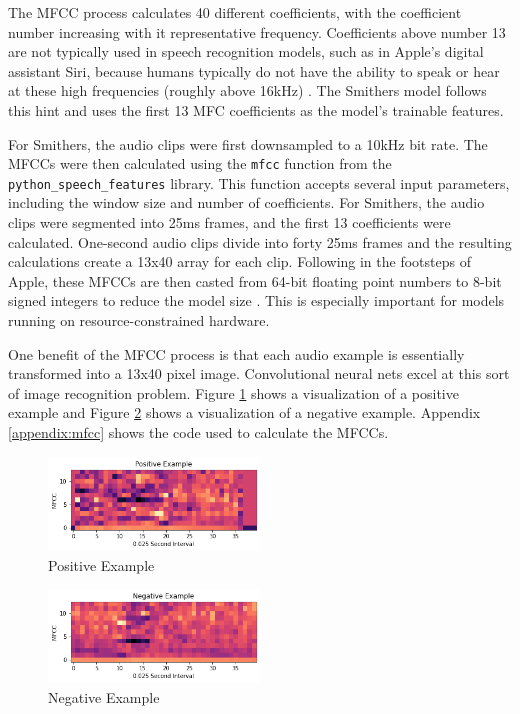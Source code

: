 \documentclass[conference]{IEEEtran}
\newcommand{\code}[1]{\texttt{#1}}
\begin{document}
The MFCC process calculates 40 different coefficients,
with the coefficient number increasing with it representative frequency.
Coefficients above number 13 are not typically used in speech recognition models,
such as in Apple's digital assistant Siri,
because humans typically do not have the ability 
to speak or hear at these high frequencies (roughly above 16kHz) \cite{Efficient}.
The Smithers model follows this hint and uses the first 13 MFC coefficients as the model's trainable features.

For Smithers, the audio clips were first downsampled to a 10kHz bit rate.
The MFCCs were then calculated using the \code{mfcc} function 
from the \code{python\_speech\_features} library.
This function accepts several input parameters, including the window size and number of coefficients.
For Smithers, the audio clips were segmented into 25ms frames, and the first 13 coefficients were calculated.
One-second audio clips divide into forty 25ms frames and the resulting calculations create a 13x40 array for each clip.
Following in the footsteps of Apple,
these MFCCs are then casted from 64-bit floating point numbers 
to 8-bit signed integers to reduce the model size \cite{Efficient}.
This is especially important for models running on resource-constrained hardware.

One benefit of the MFCC process is that each audio example is essentially transformed into a 13x40 pixel image.
Convolutional neural nets excel at this sort of image recognition problem. 
Figure \ref{fig:pos} shows a visualization of a positive example 
and Figure \ref{fig:neg} shows a visualization of a negative example.
Appendix \ref{appendix:mfcc} shows the code used to calculate the MFCCs.

\begin{figure}[htbp]
    \centerline{\includegraphics[width=0.5\textwidth]{figs/positive.png}}
    \caption{Positive Example}
    \label{fig:pos}
\end{figure}

\begin{figure}[htbp]
    \centerline{\includegraphics[width=0.5\textwidth]{figs/negative.png}}
    \caption{Negative Example}
    \label{fig:neg}
\end{figure}
\end{document}
